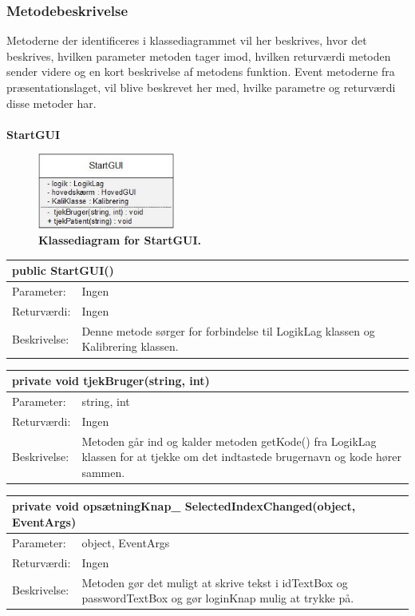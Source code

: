 \subsubsection{Metodebeskrivelse}
Metoderne der identificeres i klassediagrammet vil her beskrives, hvor det beskrives, hvilken parameter metoden tager imod, hvilken returværdi metoden sender videre og en kort beskrivelse af metodens funktion. Event metoderne fra præsentationslaget, vil blive beskrevet her med, hvilke parametre og returværdi disse metoder har. \\\\
\textbf{StartGUI}
\begin{figure}[H]
\includegraphics[width =0.4\textwidth , center]{billeder/klassediagramStart}
\caption{\textbf{Klassediagram for StartGUI.}}
\end{figure}
\begin{table}[H]
\label{tab:tabel2}
\begin{tabular}{| l | p{13cm} |}
   \hline
   \multicolumn{2}{|l|}{public StartGUI()} \\ \hline
   Parameter: & Ingen\\ \hline
   Returværdi: & Ingen \\ \hline
   Beskrivelse: & Denne metode sørger for forbindelse til LogikLag klassen og Kalibrering klassen.\\ \hline
\end{tabular}
\end{table}
\begin{table}[H]
\label{tab:tabel2}
\begin{tabular}{| l | p{13cm} |}
   \hline
   \multicolumn{2}{|l|}{private void tjekBruger(string, int)} \\ \hline
   Parameter: & string, int\\ \hline
   Returværdi: & Ingen \\ \hline
   Beskrivelse: & Metoden går ind og kalder metoden getKode() fra LogikLag klassen for at tjekke om det indtastede brugernavn og kode hører sammen.\\ \hline
\end{tabular}
\end{table}
\begin{table}[H]
\label{tab:tabel2}
\begin{tabular}{| l | p{13cm} |}
   \hline
   \multicolumn{2}{|l|}{private void opsætningKnap\_ SelectedIndexChanged(object, EventArgs)} \\ \hline
   Parameter: & object, EventArgs\\ \hline
   Returværdi: & Ingen \\ \hline
   Beskrivelse: & Metoden gør det muligt at skrive tekst i idTextBox og passwordTextBox og gør loginKnap mulig at trykke på.\\ \hline
\end{tabular}
\end{table}
